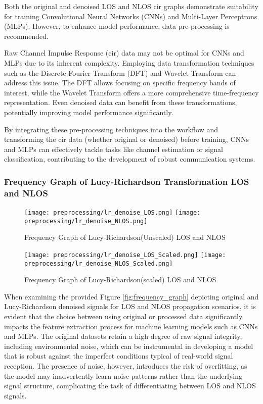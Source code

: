 Both the original and denoised LOS and NLOS \gls{cir} graphs demonstrate suitability for training Convolutional Neural Networks (CNNs) and Multi-Layer Perceptrons (MLPs). However, to enhance model performance, data pre-processing is recommended. 

Raw Channel Impulse Response (\gls{cir}) data may not be optimal for CNNs and MLPs due to its inherent complexity. Employing data transformation techniques such as the Discrete Fourier Transform (DFT) and Wavelet Transform can address this issue. The DFT allows focusing on specific frequency bands of interest, while the Wavelet Transform offers a more comprehensive time-frequency representation. Even denoised data can benefit from these transformations, potentially improving model performance significantly.

By integrating these pre-processing techniques into the workflow and transforming the \gls{cir} data (whether original or denoised) before training, CNNs and MLPs can effectively tackle tasks like channel estimation or signal classification, contributing to the development of robust communication systems.

\subsubsection{Frequency Graph of Lucy-Richardson Transformation LOS and NLOS}\label{frequency_graph_lr}

\begin{figure}[H] 
  \centering
  \texttt{[image: preprocessing/lr\_denoise\_LOS.png]}
  \texttt{[image: preprocessing/lr\_denoise\_NLOS.png]}
  \caption{Frequency Graph of Lucy-Richardson(Unscaled) LOS and NLOS}\label{fig:frequency_graph_lr}
\end{figure}

\begin{figure}[H] 
  \centering
  \texttt{[image: preprocessing/lr\_denoise\_LOS\_Scaled.png]}
  \texttt{[image: preprocessing/lr\_denoise\_NLOS\_Scaled.png]}
  \caption{Frequency Graph of Lucy-Richardson(scaled) LOS and NLOS}\label{fig:frequency_graph_lr_scaled}
\end{figure}

When examining the provided Figure \ref{fig:frequency_graph} depicting original and Lucy-Richardson denoised signals for LOS and NLOS propagation scenarios, it is evident that the choice between using original or processed data significantly impacts the feature extraction process for machine learning models such as CNNs and MLPs. The original datasets retain a high degree of raw signal integrity, including environmental noise, which can be instrumental in developing a model that is robust against the imperfect conditions typical of real-world signal reception. The presence of noise, however, introduces the risk of overfitting, as the model may inadvertently learn noise patterns rather than the underlying signal structure, complicating the task of differentiating between LOS and NLOS signals.

